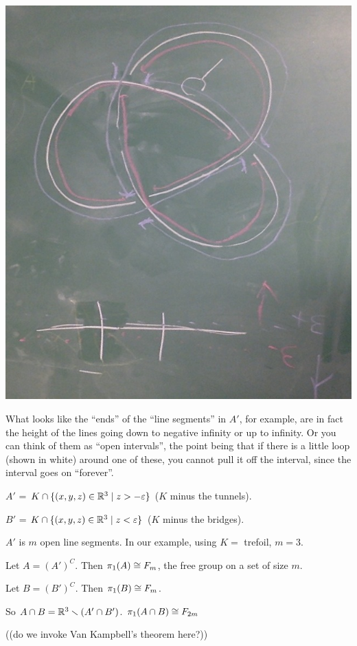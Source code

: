 \documentclass[11pt,leqno,oneside]{amsart}
\numberwithin{thm}{section}
\newcommand{\minus}{\smallsetminus}
\renewcommand{\epsilon}{\varepsilon}
\newcommand{\fund}{\pi_1}
\begin{document}
\begin{example}
  \includegraphics[scale=0.2]{images/trefoil-with-red-and-blue.jpg}

  What looks like the ``ends'' of the ``line segments'' in $A'$, for example, are in fact the height of the lines going down to negative infinity or up to infinity.  Or you can think of them as ``open intervals'', the point being that if there is a little loop (shown in white) around one of these, you cannot pull it off the interval, since the interval goes on ``forever''.

  $A'$ = $K \cap \{(x,y,z) \in \R^3 \mid z > -\epsilon\}$ ($K$ minus the tunnels).

  $B'$ = $K \cap \{(x,y,z) \in \R^3 \mid z < \epsilon\}$ ($K$ minus the bridges).

  $A'$ is $m$ open line segments.  In our example, using $K =$ trefoil, $m = 3$.

  Let $A = (A')^C$.  Then $\fund(A) \isom F_m$, the free group on a set of size $m$.

  Let $B = (B')^C$.  Then $\fund(B) \isom F_m$.

  So $A \cap B = \R^3 \minus (A' \union B')$.  $\fund(A \cap B) \isom F_{2m}$

  ((do we invoke Van Kampbell's theorem here?))


\end{example}
\end{document}
